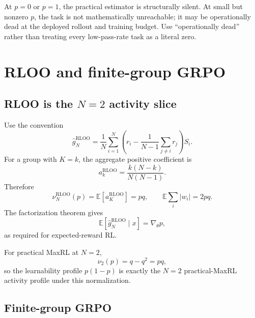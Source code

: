 \documentclass[11pt]{article}
\newcommand{\E}{\mathbb{E}}
\newcommand{\grad}{\nabla_{\!\theta}}
\theoremstyle{definition}
\theoremstyle{remark}
\begin{document}
\begin{evidencebox}
At $p=0$ or $p=1$, the practical estimator is structurally silent. At small but nonzero $p$, the task is not mathematically unreachable; it may be operationally dead at the deployed rollout and training budget. Use ``operationally dead'' rather than treating every low-pass-rate task as a literal zero.
\end{evidencebox}

\section{RLOO and finite-group GRPO}

\subsection{RLOO is the $N=2$ activity slice}

Use the convention
\begin{equation}
\widehat g_N^{\mathrm{RLOO}}
=\frac1N\sum_{i=1}^{N}
\left(r_i-\frac{1}{N-1}\sum_{j\ne i}r_j\right)S_i.
\label{eq:rloo}
\end{equation}
For a group with $K=k$, the aggregate positive coefficient is
\begin{equation}
 a_k^{\mathrm{RLOO}}=\frac{k(N-k)}{N(N-1)}.
\end{equation}
Therefore
\begin{equation}
\nu_N^{\mathrm{RLOO}}(p)
=\E[a_K^{\mathrm{RLOO}}]
=pq,
\qquad
\E\sum_i|w_i|=2pq.
\label{eq:rloo-mass}
\end{equation}
The factorization theorem gives
\[
\E[\widehat g_N^{\mathrm{RLOO}}\mid x]=\grad p,
\]
as required for expected-reward RL.

For practical MaxRL at $N=2$,
\[
\nu_2(p)=q-q^2=pq,
\]
so the learnability profile $p(1-p)$ is exactly the $N=2$ practical-MaxRL activity profile under this normalization.

\subsection{Finite-group GRPO}
\end{document}
